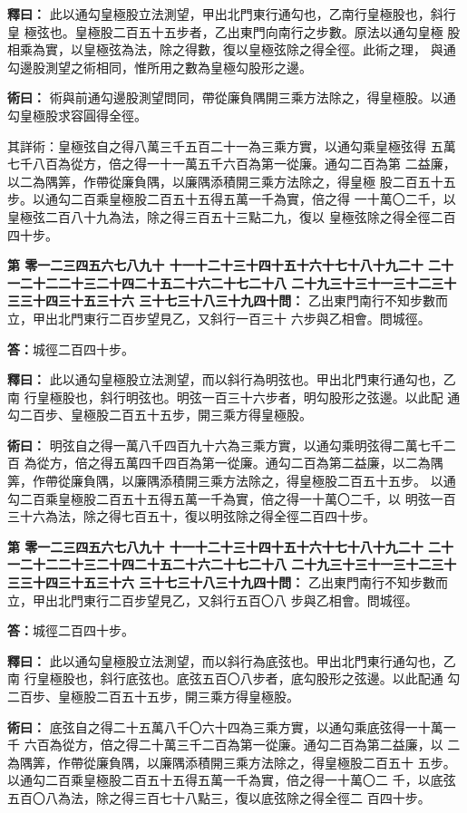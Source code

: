 \documentclass[11pt,a4paper]{article}
\newcounter{probnum}
\newcommand{\chnum}[1]{%
  \ifcase#1 零\or 一\or 二\or 三\or 四\or 五\or 六\or 七\or 八\or 九\or 十\or
    十一\or 十二\or 十三\or 十四\or 十五\or 十六\or 十七\or 十八\or 十九\or 二十\or
    二十一\or 二十二\or 二十三\or 二十四\or 二十五\or 二十六\or 二十七\or 二十八\or
    二十九\or 三十\or 三十一\or 三十二\or 三十三\or 三十四\or 三十五\or 三十六\or
    三十七\or 三十八\or 三十九\or 四十\fi}
\newcommand{\problem}[1]{\stepcounter{probnum}\par\noindent\textbf{第\chnum{\value{probnum}}問：}#1\par}
\newcommand{\answer}[1]{\par\noindent\textbf{答：}#1\par}
\newcommand{\shiyi}[1]{\par\noindent\textbf{釋曰：}#1\par}
\newcommand{\shuyue}[1]{\par\noindent\textbf{術曰：}#1\par}
\begin{document}
\shiyi{
此以通勾皇極股立法測望，甲出北門東行通勾也，乙南行皇極股也，斜行皇
極弦也。皇極股二百五十五步者，乙出東門向南行之步數。原法以通勾皇極
股相乘為實，以皇極弦為法，除之得數，復以皇極弦除之得全徑。此術之理，
與通勾邊股測望之術相同，惟所用之數為皇極勾股形之邊。
}

\shuyue{
術與前通勾邊股測望問同，帶從廉負隅開三乘方法除之，得皇極股。以通
勾皇極股求容圓得全徑。

其詳術：皇極弦自之得八萬三千五百二十一為三乘方實，以通勾乘皇極弦得
五萬七千八百為從方，倍之得一十一萬五千六百為第一從廉。通勾二百為第
二益廉，以二為隅筭，作帶從廉負隅，以廉隅添積開三乘方法除之，得皇極
股二百五十五步。以通勾二百乘皇極股二百五十五得五萬一千為實，倍之得
一十萬〇二千，以皇極弦二百八十九為法，除之得三百五十三點二九，復以
皇極弦除之得全徑二百四十步。
}

\vspace{0.3cm}
\problem{
乙出東門南行不知步數而立，甲出北門東行二百步望見乙，又斜行一百三十
六步與乙相會。問城徑。
}

\answer{城徑二百四十步。}

\shiyi{
此以通勾皇極股立法測望，而以斜行為明弦也。甲出北門東行通勾也，乙南
行皇極股也，斜行明弦也。明弦一百三十六步者，明勾股形之弦邊。以此配
通勾二百步、皇極股二百五十五步，開三乘方得皇極股。
}

\shuyue{
明弦自之得一萬八千四百九十六為三乘方實，以通勾乘明弦得二萬七千二百
為從方，倍之得五萬四千四百為第一從廉。通勾二百為第二益廉，以二為隅
筭，作帶從廉負隅，以廉隅添積開三乘方法除之，得皇極股二百五十五步。
以通勾二百乘皇極股二百五十五得五萬一千為實，倍之得一十萬〇二千，以
明弦一百三十六為法，除之得七百五十，復以明弦除之得全徑二百四十步。
}

\vspace{0.3cm}
\problem{
乙出東門南行不知步數而立，甲出北門東行二百步望見乙，又斜行五百〇八
步與乙相會。問城徑。
}

\answer{城徑二百四十步。}

\shiyi{
此以通勾皇極股立法測望，而以斜行為底弦也。甲出北門東行通勾也，乙南
行皇極股也，斜行底弦也。底弦五百〇八步者，底勾股形之弦邊。以此配通
勾二百步、皇極股二百五十五步，開三乘方得皇極股。
}

\shuyue{
底弦自之得二十五萬八千〇六十四為三乘方實，以通勾乘底弦得一十萬一千
六百為從方，倍之得二十萬三千二百為第一從廉。通勾二百為第二益廉，以
二為隅筭，作帶從廉負隅，以廉隅添積開三乘方法除之，得皇極股二百五十
五步。以通勾二百乘皇極股二百五十五得五萬一千為實，倍之得一十萬〇二
千，以底弦五百〇八為法，除之得三百七十八點三，復以底弦除之得全徑二
百四十步。
}
\end{document}
